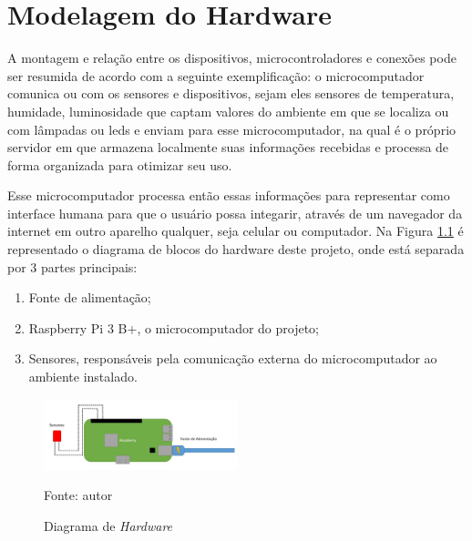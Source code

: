 \documentclass[../../layout.tex]{subfiles}
\begin{document}
\chapter{Modelagem do Hardware}
\hspace*{3em}A montagem e relação entre os dispositivos, microcontroladores e conexões pode ser resumida de acordo com a seguinte exemplificação: o microcomputador comunica ou com os sensores e dispositivos, sejam eles sensores de temperatura, humidade, luminosidade que captam valores do ambiente em que se localiza ou com lâmpadas ou leds e enviam para esse microcomputador, na qual é o próprio servidor em que armazena localmente suas informações recebidas e processa de forma organizada para otimizar seu uso. \par
\hspace*{3em}Esse microcomputador processa então essas informações para representar como interface humana para que o usuário possa integarir, através de um navegador da internet em outro aparelho qualquer, seja celular ou computador. Na Figura \ref{fig:hwmodel} é representado o diagrama de blocos do hardware deste projeto, onde está separada por 3 partes principais:

\begin{enumerate}[label=\alph*)]
\itemsep0em
    \item Fonte de alimentação; 
    \item Raspberry Pi 3 B+, o microcomputador do projeto;
    \item Sensores, responsáveis pela comunicação externa do microcomputador ao ambiente instalado.
\end{enumerate}
 
\begin{figure}[H]
\centering
\caption{Diagrama de \emph{Hardware}}
\includegraphics[width=0.5\textwidth]{assets/static/img/hwmodel.jpg}
\label{fig:hwmodel}

\begin{minipage}{0.5\textwidth}
\raggedright \footnotesize Fonte: autor 
\end{minipage}
\end{figure}
\end{document}
